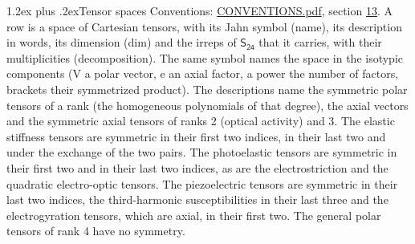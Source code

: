 \documentclass[10pt,a4paper]{article}
\makeatletter
\renewcommand\section{\@startsection{section}{1}{\z@}{-3ex plus -1ex minus -.2ex}%
  {1.2ex plus .2ex}{\normalfont\large\sffamily\bfseries\color{parttitle}}}
\numberwithin{equation}{section}
\newcommand{\grp}[1]{\mathsf{#1}}
\makeatother
\begin{document}
\section{Tensor spaces}\label{s:tensor_spaces}
Conventions: \href{../../CONVENTIONS.pdf}{CONVENTIONS.pdf}, section \href{../../CONVENTIONS.pdf\#conv.13}{13}.
\leavevmode\label{n:head.name}\label{n:head.description}\label{n:head.dim}\label{n:head.decomposition}A row is a space of Cartesian tensors, with its Jahn symbol (name), its description in words, its dimension (dim) and the irreps of $\grp{S_{24}}$ that it carries, with their multiplicities (decomposition). \label{n:label.jahn}The same symbol names the space in the isotypic components (V a polar vector, e an axial factor, a power the number of factors, brackets their symmetrized product). The descriptions name the symmetric polar tensors of a rank (the homogeneous polynomials of that degree), the axial vectors and the symmetric axial tensors of ranks 2 (optical activity) and 3. The elastic stiffness tensors are symmetric in their first two indices, in their last two and under the exchange of the two pairs. The photoelastic tensors are symmetric in their first two and in their last two indices, as are the electrostriction and the quadratic electro-optic tensors. The piezoelectric tensors are symmetric in their last two indices, the third-harmonic susceptibilities in their last three and the electrogyration tensors, which are axial, in their first two. The general polar tensors of rank 4 have no symmetry.
\end{document}
